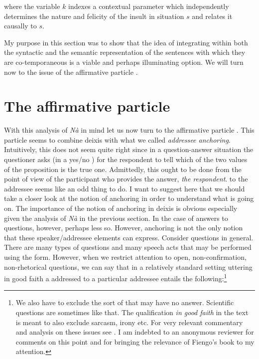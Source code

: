 \documentclass[output=paper]{LSP/langsci}
\begin{document}
where the variable $k$ indexes a contextual parameter which independently determines the nature and felicity of the insult in situation $s$ and relates it causally to $s$.  

My purpose in this section was to show that the idea of integrating  within both the syntactic and the semantic representation of the sentences with which they are co-temporaneous is a viable and perhaps illuminating option.  We will turn now to the issue of the affirmative particle \nai.



\section{The affirmative particle \nai}
\label{sec5}
With this analysis of \textit{N\`{a}} in mind let us now turn to the affirmative particle \nai.  This particle seems to combine deixis with what we called \textit{addressee anchoring}.  Intuitively, this does not seem quite right since in a question-answer situation the questioner asks (in a yes/no ) for the respondent to tell which of the two values of the proposition is the true one.  Admittedly, this ought to be done from the point of view of the participant who provides the answer, \textit{the respondent}.   to the addressee seems like an odd thing to do.  I want to suggest here that we should take a closer look at the notion of anchoring in order to understand what is going on.  The importance of the notion of anchoring in deixis is obvious especially given the analysis of \textit{N\`{a}} in the previous section.  In the case of answers to questions, however, perhaps less so.  However, anchoring is not the only notion that these speaker/addressee elements can express. Consider questions in general.  There are many types of questions and many speech acts that may be performed using the  form.  However, when we restrict attention to open, non-confirmation, non-rhetorical questions, we can say that in a relatively standard setting uttering in good faith a  addressed to a particular addressee entails the following:\footnote{We also have to exclude the sort of  that may have no answer.  Scientific questions are sometimes like that.  The qualification \textit{in good faith} in the text is meant to also exclude sarcasm, irony etc.  For very relevant commentary and analysis on these issues see \citet{fiengo:07}.  I am indebted to an anonymous reviewer for comments on this point and for bringing the relevance of Fiengo's book to my attention.} 
\end{document}
